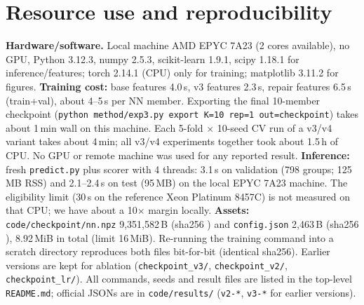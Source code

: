 \documentclass[10pt,a4paper]{article}
\begin{document}
\section{Resource use and reproducibility}
\textbf{Hardware/software.} Local machine AMD EPYC 7A23 (2 cores available), no GPU, Python 3.12.3, numpy 2.5.3, scikit-learn 1.9.1, scipy 1.18.1 for inference/features; torch 2.14.1 (CPU) only for training; matplotlib 3.11.2 for figures. \textbf{Training cost:} base features 4.0\,s, v3 features 2.3\,s, repair features 6.5\,s (train+val), about 4--5\,s per NN member. Exporting the final 10-member checkpoint (\texttt{python method/exp3.py export K=10 rep=1 out=checkpoint}) takes about 1\,min wall on this machine. Each 5-fold $\times$ 10-seed CV run of a v3/v4 variant takes about 4\,min; all v3/v4 experiments together took about 1.5\,h of CPU. No GPU or remote machine was used for any reported result. \textbf{Inference:} fresh \texttt{predict.py} plus scorer with 4 threads: 3.1\,s on validation (798 groups; 125\,MB RSS) and 2.1--2.4\,s on test (95\,MB) on the local EPYC 7A23 machine. The eligibility limit (30\,s on the reference Xeon Platinum 8457C) is not measured on that CPU; we have about a 10$\times$ margin locally. \textbf{Assets:} \texttt{code/checkpoint/nn.npz} 9{,}351{,}582\,B (sha256 \texttt{}) and \texttt{config.json} 2{,}463\,B (sha256 \texttt{}), 8.92\,MiB in total (limit 16\,MiB). Re-running the training command into a scratch directory reproduces both files bit-for-bit (identical sha256). Earlier versions are kept for ablation (\texttt{checkpoint\_v3/}, \texttt{checkpoint\_v2/}, \texttt{checkpoint\_lr/}). All commands, seeds and result files are listed in the top-level \texttt{README.md}; official JSONs are in \texttt{code/results/} (\texttt{v2-*}, \texttt{v3-*} for earlier versions).
\end{document}
